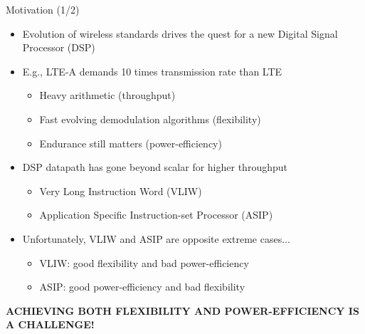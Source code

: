 \documentclass{beamer}
\begin{document}
\begin{CJK}{UTF8}{bkai}
    \begin{frame}{Motivation (1/2)}
        \begin{itemize}
            \pause
            \item {
                    Evolution of wireless standards drives the quest for a new Digital Signal Processor (DSP)
                }
            \pause
            \item {
                    E.g., LTE-A demands 10 times transmission rate than LTE
                    \begin{itemize}
                        \item {
                                Heavy arithmetic (throughput)
                            }
                        \item {
                                Fast evolving demodulation algorithms (flexibility)
                            }
                        \item {
                                Endurance still matters (power-efficiency)
                            }
                    \end{itemize}
                }
            \pause
            \item { 
                    DSP datapath has gone beyond scalar for higher throughput
                    \begin{itemize}
                        \item Very Long Instruction Word (VLIW)
                        \item Application Specific Instruction-set Processor (ASIP)
                    \end{itemize}
                }
            \pause
            \item {
                    Unfortunately, VLIW and ASIP are opposite extreme cases...
                    \begin{itemize}
                        \item VLIW: good flexibility and bad power-efficiency
                        \item ASIP: good power-efficiency and bad flexibility
                    \end{itemize}
                }
        \end{itemize}
        \pause
        \begin{center}
        \large{\textbf{ACHIEVING BOTH FLEXIBILITY AND POWER-EFFICIENCY IS A CHALLENGE!}}
        \end{center}
    \end{frame}


\end{CJK}
\end{document}
